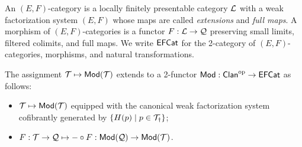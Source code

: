 \documentclass[a4paper]{article}
\begin{document}
\begin{definition}
  An $(E,F)$-category is a locally finitely presentable category $\mathcal{L}$ with a weak factorization system $(E,F)$ whose maps are called \emph{extensions} and \emph{full maps}.
  A morphism of $(E,F)$-categories is a functor $F : \mathcal{L} \to \mathcal{Q}$ preserving small limits, filtered colimits, and full maps.
  We write $\mathsf{EFCat}$ for the 2-category of $(E,F)$-categories, morphisms, and natural transformations.
\end{definition}

\begin{construction}
  The assignment $\mathcal{T} \mapsto \mathsf{Mod}(\mathcal{T})$ extends to a 2-functor $\mathsf{Mod} : \mathsf{Clan}^{\mathrm{op}} \to \mathsf{EFCat}$ as follows:
  \begin{itemize}
  \item $\mathcal{T} \mapsto \mathsf{Mod}(\mathcal{T})$ equipped with the canonical weak factorization system cofibrantly generated by $\{H(p) \mid p \in \mathcal{T}_{\dag}\}$;
  \item $F : \mathcal{T} \to \mathcal{Q} \mapsto - \circ F : \mathsf{Mod}(\mathcal{Q}) \to \mathsf{Mod}(\mathcal{T})$.
  \end{itemize}
\end{construction}
\end{document}
